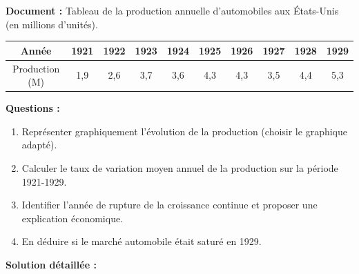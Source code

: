 \documentclass[11pt]{article}
\begin{document}
\begin{exoresolu}
\textbf{Document :} Tableau de la production annuelle d'automobiles aux États-Unis (en millions d'unités).
\begin{center}
\begin{tabular}{|c|c|c|c|c|c|c|c|c|c|}\hline
Année & 1921 & 1922 & 1923 & 1924 & 1925 & 1926 & 1927 & 1928 & 1929 \\ \hline
Production (M) & 1,9 & 2,6 & 3,7 & 3,6 & 4,3 & 4,3 & 3,5 & 4,4 & 5,3 \\ \hline
\end{tabular}
\end{center}

\textbf{Questions :}
\begin{enumerate}
    \item Représenter graphiquement l'évolution de la production (choisir le graphique adapté).
    \item Calculer le taux de variation moyen annuel de la production sur la période 1921-1929.
    \item Identifier l'année de rupture de la croissance continue et proposer une explication économique.
    \item En déduire si le marché automobile était saturé en 1929.
\end{enumerate}

\tcblower

\textbf{Solution détaillée :}


\end{exoresolu}
\end{document}
